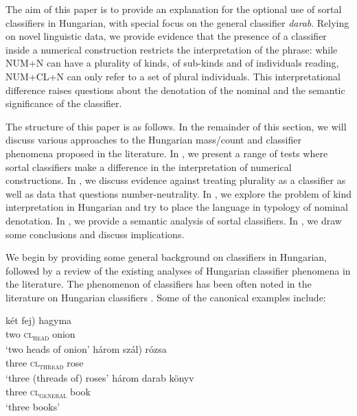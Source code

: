 \documentclass[output=paper]{langscibook}
\begin{document}
The aim of this paper is to provide an explanation for the optional use of sortal classifiers in Hungarian, with special focus on the general classifier \textit{darab}. Relying on novel linguistic data, we provide evidence that the presence of a classifier inside a numerical construction restricts the interpretation of the phrase: while NUM+N can have a plurality of kinds, of sub-kinds and of  individuals reading, NUM+CL+N can only refer to a set of plural individuals. This interpretational difference raises questions about the denotation of the nominal and the semantic significance of the classifier.

The structure of this paper is as follows. In the remainder of this section, we will discuss various approaches to the Hungarian mass/count and classifier phenomena proposed in the literature. In , we present a range of tests where sortal classifiers make a difference in the interpretation of numerical constructions. In , we discuss evidence against treating plurality as a classifier as well as data that questions number-neutrality. In  , we explore the problem of kind interpretation in Hungarian and try to place the language in  %
typology of nominal denotation. In , we provide a semantic analysis of sortal classifiers. In , we draw some conclusions and discuss implications.

We begin by providing some general background on classifiers in Hungarian, followed by a review of the existing analyses of Hungarian classifier phenomena in the literature. The phenomenon of classifiers has been often noted in the literature on Hungarian classifiers \citep{beckwith-92, beckwith-07, csirmaz-dekany-14, schvarcz-rothstein-17, szabo-toth-18, schvarcz-wohlmuth-20}. Some of the canonical examples include:  

\ea \label{schv-nem:ex:2}
\ea \label{schv-nem:ex:2a}
\gll két \minsp{(} fej) hagyma\\  
     two {} \textsc{cl\textsubscript{head}} onion\\ 
\glt `two heads of onion'
\ex \label{schv-nem:ex:2b}
\gll három \minsp{(} szál) rózsa\\
    three {} \textsc{cl\textsubscript{thread}} rose\\
\glt `three (threads of) roses'
\ex \label{schv-nem:ex:2c}
\gll három darab könyv\\
    three \textsc{cl\textsubscript{general}} book\\
\glt `three books'
\z
\z
\end{document}

